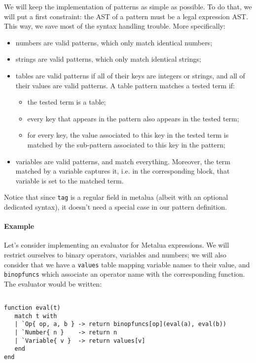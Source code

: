We will keep the implementation of patterns as simple as possible. To
do that, we will put a first constraint: the AST of a pattern must be
a legal expression AST. This way, we save most of the syntax handling
trouble. More specifically:

\begin{itemize}
\item numbers are valid patterns, which only match identical numbers;
\item strings are valid patterns, which only match identical strings;
\item tables are valid patterns if all of their keys are integers or
  strings, and all of their values are valid patterns. A table pattern
  matches a tested term if:
  \begin{itemize}
  \item the tested term is a table;
  \item every key that appears in the pattern also appears in the
    tested term;
  \item for every key, the value associated to this key in the tested
    term is matched by the sub-pattern associated to this key in the
    pattern;
  \end{itemize}
\item variables are valid patterns, and match everything. Moreover,
  the term matched by a variable captures it, i.e. in the
  corresponding block, that variable is set to the
  matched term.
\end{itemize}

Notice that since \verb|tag| is a regular field in metalua (albeit
with an optional dedicated syntax), it doesn't need a special case in
our pattern definition.

\paragraph{Example} Let's consider implementing an evaluator for
Metalua expressions. We will restrict ourselves to binary operators,
variables and numbers; we will also consider that we have a
\verb|values| table mapping variable names to their value, and
\verb|binopfuncs| which associate an operator name with the corresponding
function. The evaluator would be written:

\begin{Verbatim}[fontsize=\scriptsize]

function eval(t)
   match t with
   | `Op{ op, a, b } -> return binopfuncs[op](eval(a), eval(b))
   | `Number{ n }    -> return n
   | `Variable{ v }  -> return values[v]
   end
end
\end{Verbatim}

